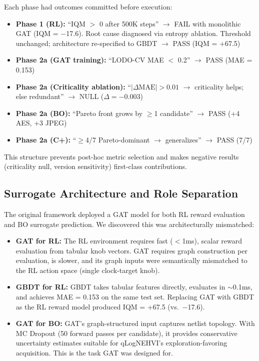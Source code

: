 \documentclass[conference]{IEEEtran}
\begin{document}
Each phase had outcomes committed before execution:

\begin{itemize}
\item \textbf{Phase 1 (RL):} ``IQM $>$ 0 after 500K steps'' $\rightarrow$ FAIL
with monolithic GAT (IQM = $-$17.6). Root cause diagnosed via entropy ablation.
Threshold unchanged; architecture re-specified to GBDT $\rightarrow$ PASS
(IQM = +67.5)
\item \textbf{Phase 2a (GAT training):} ``LODO-CV MAE $<$ 0.2'' $\rightarrow$ PASS
(MAE = 0.153)
\item \textbf{Phase 2a (Criticality ablation):} ``$|\Delta\text{MAE}|>0.01$
$\rightarrow$ criticality helps; else redundant'' $\rightarrow$ NULL ($\Delta = -0.003$)
\item \textbf{Phase 2a (BO):} ``Pareto front grows by $\geq$1 candidate''
$\rightarrow$ PASS (+4 AES, +3 JPEG)
\item \textbf{Phase 2a (C+):} ``$\geq$4/7 Pareto-dominant $\rightarrow$
generalizes'' $\rightarrow$ PASS (7/7)
\end{itemize}

This structure prevents post-hoc metric selection and makes negative results
(criticality null, version sensitivity) first-class contributions.

\subsection{Surrogate Architecture and Role Separation}

The original framework deployed a GAT model for both RL reward evaluation and BO
surrogate prediction. We discovered this was architecturally mismatched:

\begin{itemize}
\item \textbf{GAT for RL:} The RL environment requires fast ($<$1ms), scalar reward
evaluation from tabular knob vectors. GAT requires graph construction per evaluation,
is slower, and its graph inputs were semantically mismatched to the RL action space
(single clock-target knob).

\item \textbf{GBDT for RL:} GBDT takes tabular features directly, evaluates in
$\sim$0.1ms, and achieves MAE = 0.153 on the same test set. Replacing GAT with
GBDT as the RL reward model produced IQM = +67.5 (vs.\ $-$17.6).

\item \textbf{GAT for BO:} GAT's graph-structured input captures netlist topology.
With MC Dropout (50 forward passes per candidate), it provides conservative
uncertainty estimates suitable for qLogNEHVI's exploration-favoring acquisition.
This is the task GAT was designed for.
\end{itemize}
\end{document}
